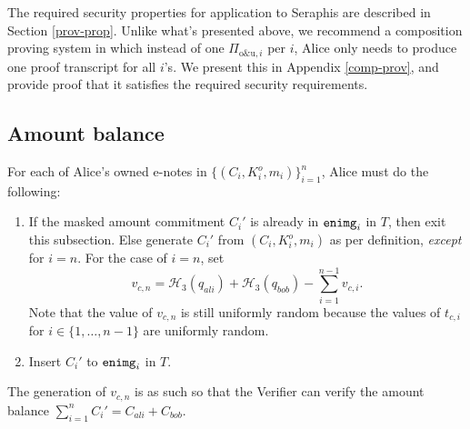 \documentclass{article}
\begin{document}
The required security properties for application to Seraphis are described in Section \ref{prov-prop}. Unlike what's presented above, we recommend a composition proving system in which instead of one $\Pi_{\text{o\&u}, i}$ per $i$, Alice only needs to produce one proof transcript for all $i$'s. We present this in Appendix \ref{comp-prov}, and provide proof that it satisfies the required security requirements.

\subsection{Amount balance}\label{amt-bal}
For each of Alice's owned e-notes in $\{(C_i,K_i^o,m_i)\}_{i=1}^n$, Alice must do the following:
\begin{enumerate}
    \item If the masked amount commitment $C_i'$ is already in ${\tt enimg}_i$ in $T$, then exit this subsection. Else generate $C_i'$ from $(C_i, K_i^o, m_i)$ as per definition, \textit{except} for $i=n$. For the case of $i=n$, set
    $$v_{c,n} = \mathcal{H}_3(q_{ali}) + \mathcal{H}_3(q_{bob}) - \sum_{i=1}^{n-1}{v_{c,i}}.$$
    Note that the value of $v_{c,n}$ is still uniformly random because the values of $t_{c,i}$ for $i\in\{1,\ldots,n-1\}$ are uniformly random.
    \item Insert $C_i'$ to ${\tt enimg}_i$ in $T$.
\end{enumerate}
The generation of $v_{c,n}$ is as such so that the Verifier can verify the amount balance $\sum_{i=1}^n{C_i'}=C_{ali}+C_{bob}$.
\end{document}
